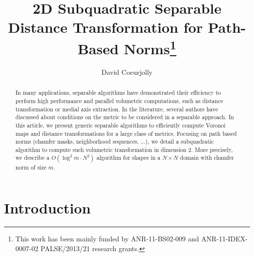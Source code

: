 \documentclass{llncs}
\title{2D Subquadratic Separable Distance Transformation for
  Path-Based Norms\thanks{This work has been mainly funded by
    ANR-11-BS02-009 and ANR-11-IDEX-0007-02 PALSE/2013/21 research
    grants.}}
\author{David Coeurjolly}
\institute{ CNRS,  LIRIS, UMR5205, F-69621, France\\
}
\begin{document}
\maketitle


\begin{abstract}\sloppy
In many applications, separable algorithms have demonstrated their
efficiency to perform high performance and parallel volumetric
computations, such as distance transformation or medial axis
extraction. In the literature, several authors have discussed about
conditions on the metric to be considered in a separable approach.  In
this article, we present generic separable algorithms to efficiently
compute Voronoi maps and distance transformations for a large class of
metrics. Focusing on path based norms (chamfer masks, neighborhood
sequences, ...), we detail a subquadratic algorithm to compute such
volumetric transformation in dimension 2. More precisely, we describe
a $O(\log^2{m}\cdot N^2)$ algorithm for shapes in a $N\times N$ domain
with chamfer norm of size $m$.

\end{abstract}

\section{Introduction}
\label{sec:introduction}
\end{document}

